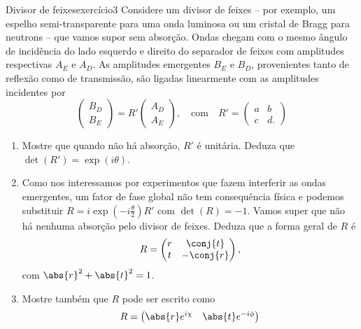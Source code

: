 \begin{exercício}{Divisor de feixes}{exercício3}
    Considere um divisor de feixes -- por exemplo, um espelho semi-transparente para uma onda luminosa ou um cristal de Bragg para neutrons -- que vamos supor sem absorção. Ondas chegam com o mesmo ângulo de incidência do lado esquerdo e direito do separador de feixes com amplitudes respectivas \(A_E\) e \(A_D\). As amplitudes emergentes \(B_E\) e \(B_D\), provenientes tanto de reflexão como de transmissão, são ligadas linearmente com as amplitudes incidentes por
    \begin{equation*}
        \begin{pmatrix}
            B_D \\ B_E
        \end{pmatrix}
        = R' \begin{pmatrix}
            A_D \\ A_E
        \end{pmatrix},\quad\text{com}\quad
        R' = \begin{pmatrix}
            a & b\\c & d.
        \end{pmatrix}
    \end{equation*}
    \begin{enumerate}[label=(\alph*)]
        \item Mostre que quando não há absorção, \(R'\) é unitária. Deduza que \(\det(R') = \exp(i\theta)\).
        \item Como nos interessamos por experimentos que fazem interferir as ondas emergentes, um fator de fase global não tem consequência física e podemos substituir \(R = i \exp\left(-i\frac\theta2\right)R'\) com \(\det(R) = -1\). Vamos super que não há nenhuma absorção pelo divisor de feixes. Deduza que a forma geral de \(R\) é
            \begin{equation*}
                R = \begin{pmatrix}
                    r & \conj{t} \\
                    t & -\conj{r}
                \end{pmatrix},
            \end{equation*}
            com \(\abs{r}^2 + \abs{t}^2 = 1\).
        \item Mostre também que \(R\) pode ser escrito como
            \begin{equation*}
                R = \begin{pmatrix}
                    \abs{r}e^{i\chi} & \abs{t} e^{-i\phi}\\

\end{pmatrix}
\end{equation*}
\end{enumerate}
\end{exercício}
